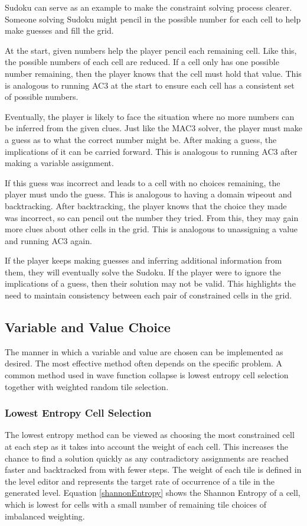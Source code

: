 Sudoku can serve as an example to make the constraint solving process clearer. Someone solving Sudoku might pencil in the possible number for each cell to help make guesses and fill the grid.

At the start, given numbers help the player pencil each remaining cell. Like this, the possible numbers of each cell are reduced. If a cell only has one possible number remaining, then the player knows that the cell must hold that value. This is analogous to running AC3 at the start to ensure each cell has a consistent set of possible numbers.

Eventually, the player is likely to face the situation where no more numbers can be inferred from the given clues. Just like the MAC3 solver, the player must make a guess as to what the correct number might be. After making a guess, the implications of it can be carried forward. This is analogous to running AC3 after making a variable assignment.

If this guess was incorrect and leads to a cell with no choices remaining, the player must undo the guess. This is analogous to having a domain wipeout and backtracking. After backtracking, the player knows that the choice they made was incorrect, so can pencil out the number they tried. From this, they may gain more clues about other cells in the grid. This is analogous to unassigning a value and running AC3 again.

If the player keeps making guesses and inferring additional information from them, they will eventually solve the Sudoku. If the player were to ignore the implications of a guess, then their solution may not be valid. This highlights the need to maintain consistency between each pair of constrained cells in the grid.

\subsection{Variable and Value Choice}\label{sec:variableAndValueChoice}
The manner in which a variable and value are chosen can be implemented as desired. The most effective method often depends on the specific problem. A common method used in wave function collapse is lowest entropy cell selection together with weighted random tile selection.

\subsubsection{Lowest Entropy Cell Selection}
The lowest entropy method can be viewed as choosing the most constrained cell at each step as it takes into account the weight of each cell. This increases the chance to find a solution quickly as any contradictory assignments are reached faster and backtracked from with fewer steps. The weight of each tile is defined in the level editor and represents the target rate of occurrence of a tile in the generated level. Equation \ref{shannonEntropy} shows the Shannon Entropy of a cell, which is lowest for cells with a small number of remaining tile choices of imbalanced weighting.%

